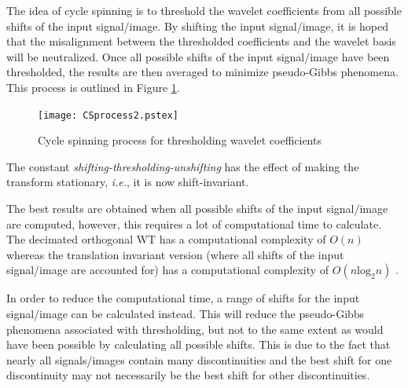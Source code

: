 \documentclass[12pt]{report}
\begin{document}
The idea of cycle spinning is to threshold the wavelet coefficients from all possible shifts 
of the input signal/image. By shifting the input signal/image, it is hoped that the misalignment 
between the thresholded coefficients and the wavelet basis will be neutralized. Once all possible
shifts of the input signal/image have been thresholded, the results are then averaged to minimize
pseudo-Gibbs phenomena. This process is outlined in Figure \ref{CSprocess}.
\vspace{0.4cm}
\begin{figure}[htb]
	\begin{center}
		\texttt{[image: CSprocess2.pstex]}
		\caption{Cycle spinning process for thresholding wavelet coefficients}
		\label{CSprocess}
	\end{center}
\end{figure}
The constant \emph{shifting-thresholding-unshifting} has the effect of making the transform stationary,
\emph{i.e.}, it is now shift-invariant.

The best results are obtained when all possible shifts of the input signal/image are computed,
however, this requires a lot of computational time to calculate. 
The decimated orthogonal WT has a computational complexity of $O(n)$ whereas the
translation invariant version (where all shifts of the input signal/image are accounted for)
has a computational complexity of $O(n\mbox{log}_{2}n)$ \cite{cena, coifman, lang96}.

In order to reduce the computational time,
a range of shifts for the input signal/image can be calculated instead. This will reduce the pseudo-Gibbs 
phenomena associated with thresholding, but not to the same extent as 
would have been possible by calculating all possible shifts.
This is due to the fact that nearly all signals/images contain many discontinuities and the best shift for one discontinuity
may not necessarily be the best shift for other discontinuities.
\end{document}
